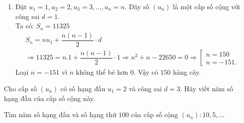 \begin{bt}
{\begin{enumerate}
			\[q\cdot(q-1)=2\Leftrightarrow q^2-q=2\Leftrightarrow q^2-q-2=0\Leftrightarrow \left[\begin{array}{l} {q=2} \\ {q=-1.} \end{array}\right.\] Với $q=2$ thay vào (1) ta được $v_1=1$.\\			
			Với $q=-1$ thay vào (1) ta được $v_1=7$.\\			
			Vậy số hạng đầu $v_1=1$ và công bội $q=2$ hoặc số hạng đầu $v_1=7$ và công bội $q=-1$.			
			\item  Đặt $u_1=1, u_2=2, u_3=3,\dots, u_n=n$. Dãy số $(u_n )$ là một cấp số cộng với công sai $d = 1$.\\
			Ta có: $S_n=11325$
			\[\begin{array}{l} {S_n=nu_1+\dfrac{n(n-1)}{2}\cdot d} \\ {\Rightarrow 11325=n.1+\dfrac{n(n-1)}{2}\cdot 1\Rightarrow n^2+n-22650=0\Rightarrow \left[\begin{array}{l} {n=150} \\ {n=-151.} \end{array}\right.} \end{array}\] Loại $n=-151$ vì $n$ không thể bé hơn $0$. Vậy có $150$ hàng cây.
		\end{enumerate}
	}
	\end{bt}

\begin{bt}%

Cho cấp số $\left(u_n\right)$ có số hạng đầu $u_1=2$ và công sai $d=3$. Hãy viết năm số hạng đầu của cấp số cộng này.
\end{bt}

\begin{bt}%

Tìm năm số hạng đầu và số hạng thứ $100$ của cấp số cộng $\left(u_n\right)\colon 10{,}5,\ldots$
\end{bt}

